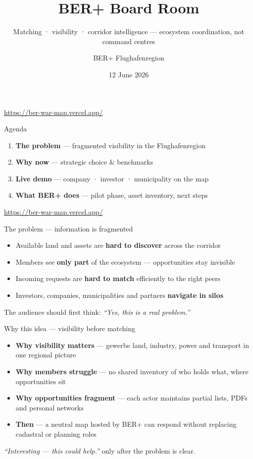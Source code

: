 \documentclass[aspectratio=169,11pt]{beamer}
\title{BER+ Board Room}
\subtitle{Matching · visibility · corridor intelligence — ecosystem coordination, not command centres}
\author{BER+ Flughafenregion}
\institute{Schönefeld corridor · Flughafenregion Berlin Brandenburg}
\date{12 June 2026}
\newcommand{\demourl}{\url{https://ber-war-map.vercel.app/}}
\begin{document}
\begin{frame}
  \titlepage
  \vfill
  \centering\demourl
\end{frame}

\begin{frame}{Agenda}
  \begin{enumerate}
    \item \textbf{The problem} --- fragmented visibility in the Flughafenregion
    \item \textbf{Why now} --- strategic choice \& benchmarks
    \item \textbf{Live demo} --- company · investor · municipality on the map
    \item \textbf{What BER+ does} --- pilot phase, asset inventory, next steps
  \end{enumerate}
  \vfill
  \small\demourl
\end{frame}

\begin{frame}{The problem --- information is fragmented}
  \begin{itemize}
    \item Available land and assets are \textbf{hard to discover} across the corridor
    \item Members see \textbf{only part} of the ecosystem --- opportunities stay invisible
    \item Incoming requests are \textbf{hard to match} efficiently to the right peers
    \item Investors, companies, municipalities and partners \textbf{navigate in silos}
  \end{itemize}
  \vspace{0.6em}
  \small
  The audience should first think: \textit{``Yes, this is a real problem.''}
\end{frame}

\begin{frame}{Why this idea --- visibility before matching}
  \begin{itemize}
    \item \textbf{Why visibility matters} --- gewerbe land, industry, power and transport in one regional picture
    \item \textbf{Why members struggle} --- no shared inventory of who holds what, where opportunities sit
    \item \textbf{Why opportunities fragment} --- each actor maintains partial lists, PDFs and personal networks
    \item \textbf{Then} --- a neutral map hosted by BER+ can respond without replacing cadastral or planning roles
  \end{itemize}
  \vspace{0.4em}
  \small\textit{``Interesting --- this could help.''} only after the problem is clear.
\end{frame}
\end{document}
